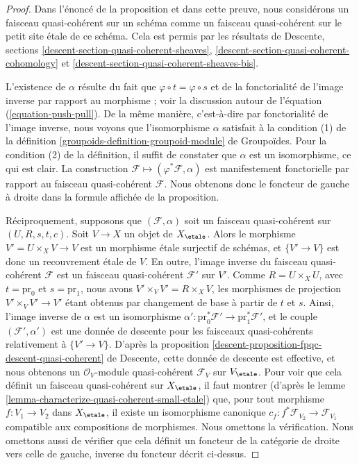 \begin{proof}
Dans l'énoncé de la proposition et dans cette preuve, nous considérons un
faisceau quasi-cohérent sur un schéma comme un faisceau quasi-cohérent sur le petit
site \'etale de ce schéma. Cela est permis par les résultats de
Descente, sections \ref{descent-section-quasi-coherent-sheaves},
\ref{descent-section-quasi-coherent-cohomology} et
\ref{descent-section-quasi-coherent-sheaves-bis}.

\medskip\noindent
L'existence de $\alpha$ résulte du fait que
$\varphi \circ t = \varphi \circ s$ et de la fonctorialité de l'image inverse
par rapport au morphisme ; voir la discussion autour de
l'équation (\ref{equation-push-pull}). De la même manière, c'est-à-dire par
fonctorialité de l'image inverse, nous voyons que l'isomorphisme $\alpha$ satisfait
à la condition (1) de la
définition \ref{groupoids-definition-groupoid-module} de Groupoïdes.
Pour la condition (2) de la définition, il suffit de constater que $\alpha$
est un isomorphisme, ce qui est clair. La construction
$\mathcal{F} \mapsto (\varphi^*\mathcal{F}, \alpha)$
est manifestement fonctorielle par rapport au faisceau quasi-cohérent $\mathcal{F}$.
Nous obtenons donc le foncteur de gauche à droite dans la formule
affichée de la proposition.

\medskip\noindent
Réciproquement, supposons que $(\mathcal{F}, \alpha)$ soit un faisceau
quasi-cohérent sur $(U, R, s, t, c)$. Soit $V \to X$ un objet de $X_\etale$.
Alors le morphisme $V' = U \times_X V \to V$ est un morphisme \'etale
surjectif de schémas, et $\{V' \to V\}$ est donc un recouvrement \'etale
de $V$. En outre, l'image inverse du faisceau quasi-cohérent $\mathcal{F}$
est un faisceau quasi-cohérent $\mathcal{F}'$ sur $V'$.
Comme $R = U \times_X U$, avec $t = \text{pr}_0$ et $s = \text{pr}_1$,
nous avons $V' \times_V V' = R \times_X V$, les morphismes de projection
$V' \times_V V' \to V'$ étant obtenus par changement de base à partir de $t$ et $s$. Ainsi,
l'image inverse de $\alpha$ est un isomorphisme
$\alpha' : \text{pr}_0^*\mathcal{F}' \to \text{pr}_1^*\mathcal{F}'$, et
le couple $(\mathcal{F}', \alpha')$ est une donnée de descente pour les faisceaux
quasi-cohérents relativement à $\{V' \to V\}$. D'après la
proposition
\ref{descent-proposition-fpqc-descent-quasi-coherent} de Descente,
cette donnée de descente est effective, et nous obtenons un
$\mathcal{O}_V$-module quasi-cohérent $\mathcal{F}_V$ sur $V_\etale$.
Pour voir que cela définit un faisceau quasi-cohérent sur $X_\etale$, il faut
montrer (d'après le
lemme \ref{lemma-characterize-quasi-coherent-small-etale})
que, pour tout morphisme $f : V_1 \to V_2$ dans $X_\etale$,
il existe un isomorphisme canonique
$c_f : f^*\mathcal{F}_{V_2} \to \mathcal{F}_{V_1}$
compatible aux compositions de morphismes. Nous omettons la vérification.
Nous omettons aussi de vérifier que cela définit un foncteur de la
catégorie de droite vers celle de gauche, inverse
du foncteur décrit ci-dessus.
\end{proof}


